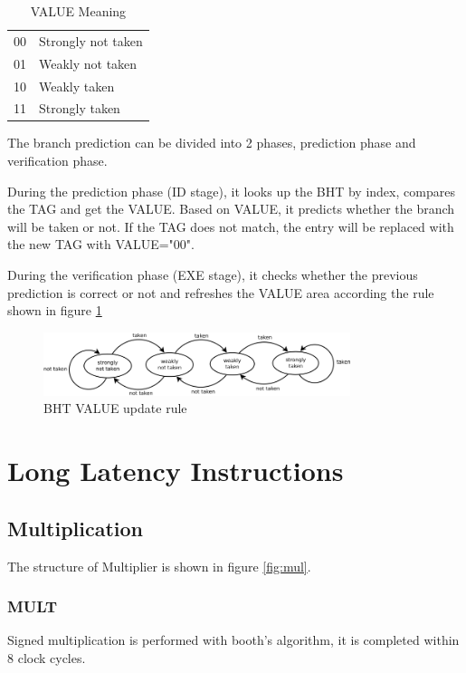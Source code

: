 \begin{table}[!ht]
\centering
\caption{VALUE Meaning}
\label{tab:bpu_value}
\begin{tabular}{|l|l|}
\hline
00 & Strongly not taken \\
01 & Weakly not taken \\
10 & Weakly taken \\
11 & Strongly taken \\
\hline
\end{tabular}
\end{table}

The branch prediction can be divided into 2 phases, prediction phase and verification phase.

During the prediction phase (ID stage), it looks up the BHT by index, compares the TAG and get the VALUE.
Based on VALUE, it predicts whether the branch will be taken or not. If the TAG does not match,
the entry will be replaced with the new TAG with VALUE="00".

During the verification phase (EXE stage), it checks whether the previous prediction
is correct or not and refreshes the VALUE area according the rule shown in figure \ref{fig:bpu_rule}
\begin{figure}[Ht]
    \centering
    \includegraphics[width=0.8\textwidth]{fig/bpu_rule.png}
    \caption{BHT VALUE update rule}
    \label{fig:bpu_rule}
\end{figure}

\section[Long Latency Instructions]{Long Latency Instructions}
\label{ch:lli}
\subsection[Multiplication]{Multiplication}
The structure of Multiplier is shown in figure \ref{fig:mul}.

\subsubsection[MULT]{MULT}
Signed multiplication is performed with booth's algorithm, it is completed within 8 clock cycles.

